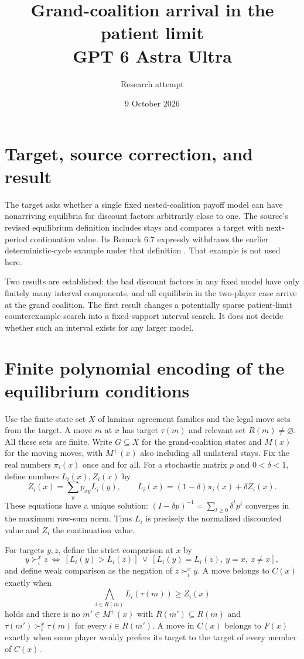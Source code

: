 \documentclass[11pt]{article}
\title{Grand-coalition arrival in the patient limit\\ GPT 6 Astra Ultra}
\author{Research attempt}
\date{9 October 2026}
\theoremstyle{definition}
\begin{document}
\maketitle

\section*{Target, source correction, and result}
The target asks whether a single fixed nested-coalition payoff model can have nonarriving equilibria for discount factors arbitrarily close to one. The source's revised equilibrium definition includes stays and compares a target with next-period continuation value. Its Remark 6.7 expressly withdraws the earlier deterministic-cycle example under that definition \cite{heitzig}. That example is not used here.

Two results are established: the bad discount factors in any fixed model have only finitely many interval components, and all equilibria in the two-player case arrive at the grand coalition. The first result changes a potentially sparse patient-limit counterexample search into a fixed-support interval search. It does not decide whether such an interval exists for any larger model.

\section*{Finite polynomial encoding of the equilibrium conditions}
Use the finite state set $X$ of laminar agreement families and the legal move sets from the target. A move $m$ at $x$ has target $\tau(m)$ and relevant set $R(m)\ne\varnothing$. All these sets are finite. Write $G\subseteq X$ for the grand-coalition states and $M(x)$ for the moving moves, with $M^+(x)$ also including all unilateral stays. Fix the real numbers $\pi_i(x)$ once and for all. For a stochastic matrix $p$ and $0<\delta<1$, define numbers $L_i(x),Z_i(x)$ by
\begin{equation}\label{bell}
 Z_i(x)=\sum_y p_{xy}L_i(y),\qquad
 L_i(x)=(1-\delta)\pi_i(x)+\delta Z_i(x).
\end{equation}
These equations have a unique solution: $(I-\delta p)^{-1}=\sum_{t\ge0}\delta^t p^t$ converges in the maximum row-sum norm. Thus $L_i$ is precisely the normalized discounted value and $Z_i$ the continuation value.

For targets $y,z$, define the strict comparison at $x$ by
\[
 y\succ_i^x z\ \Longleftrightarrow\
 [L_i(y)>L_i(z)]\ \lor\
 [L_i(y)=L_i(z),\ y=x,\ z\ne x],
\]
and define weak comparison as the negation of $z\succ_i^x y$. A move belongs to $C(x)$ exactly when
\[
 \bigwedge_{i\in R(m)}L_i(\tau(m))\ge Z_i(x)
\]
holds and there is no $m'\in M^+(x)$ with $R(m')\subseteq R(m)$ and $\tau(m')\succ_i^x\tau(m)$ for every $i\in R(m')$. A move in $C(x)$ belongs to $F(x)$ exactly when some player weakly prefers its target to the target of every member of $C(x)$.
\end{document}

